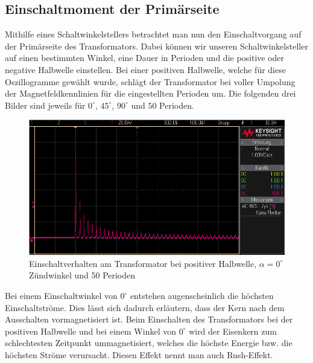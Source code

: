 \documentclass{article}
\begin{document}
\subsection{Einschaltmoment der Primärseite}
\label{sec:einsch-der-prim}

Mithilfe eines Schaltwinkelstellers betrachtet man nun den Einschaltvorgang auf der Primärseite des Transformators. Dabei können wir unseren Schaltwinkelsteller auf einen bestimmten Winkel, eine Dauer in Perioden und die positive oder negative Halbwelle einstellen.
Bei einer positiven Halbwelle, welche für diese Oszillogramme gewählt wurde, schlägt der Transformator bei voller Umpolung der Magnetfeldkennlinien für die eingestellten Perioden um. Die folgenden drei Bilder sind jeweils für $0^{\circ}$, $45^{\circ}$, $90^{\circ}$ und $50$ Perioden.

\begin{figure}[h]
  \centering
  \includegraphics[width=\textwidth]{../assets/images/gep3/einschalt_0deg.PNG}
  \caption{Einschaltverhalten am Transformator bei positiver Halbwelle, $\alpha = 0^\circ$ Zündwinkel und 50 Perioden}
  \label{fig:einschalt_0d}
\end{figure}

Bei einem Einschaltwinkel von $0^{\circ}$ entstehen augenscheinlich die höchsten Einschaltströme. Dies lässt sich dadurch erläutern, dass der Kern nach dem Ausschalten vormagnetisiert ist. Beim Einschalten des Transformators bei der positiven Halbwelle und bei einem Winkel von $0^{\circ}$ wird der Eisenkern zum schlechtesten Zeitpunkt ummagnetisiert, welches die höchste Energie bzw. die höchsten Ströme verursacht. Diesen Effekt nennt man auch Rush-Effekt.
\end{document}
